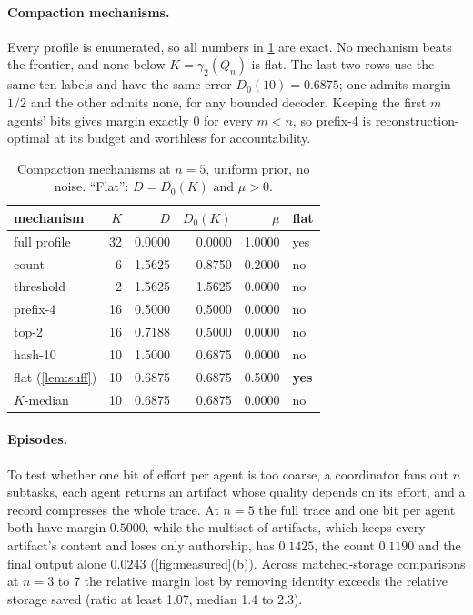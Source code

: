 \documentclass[sigconf,anonymous,acmthm=false]{acmart}
\theoremstyle{acmplain}
\theoremstyle{acmdefinition}
\begin{document}
\paragraph{Compaction mechanisms.} Every profile is enumerated, so all numbers in
\cref{tab:mech} are exact. No mechanism beats the frontier, and none below
$K=\gamma_2(Q_n)$ is flat. The last two rows use the same ten labels and have the same
error $D_0(10)=0.6875$; one admits margin $1/2$ and the other admits none, for any bounded
decoder. Keeping the first $m$ agents' bits gives margin exactly 0 for every $m<n$, so
prefix-4 is reconstruction-optimal at its budget and worthless for accountability.

\begin{table}[t]
\caption{Compaction mechanisms at $n=5$, uniform prior, no noise. ``Flat'': $D=D_0(K)$
and $\mu>0$.}
\label{tab:mech}
\footnotesize
\begin{tabular}{@{}lrrrrl@{}}
\toprule
mechanism & $K$ & $D$ & $D_0(K)$ & $\mu$ & flat\\
\midrule
full profile & 32 & 0.0000 & 0.0000 & 1.0000 & yes\\
count & 6 & 1.5625 & 0.8750 & 0.2000 & no\\
threshold & 2 & 1.5625 & 1.5625 & 0.0000 & no\\
prefix-4 & 16 & 0.5000 & 0.5000 & 0.0000 & no\\
top-2 & 16 & 0.7188 & 0.5000 & 0.0000 & no\\
hash-10 & 10 & 1.5000 & 0.6875 & 0.0000 & no\\
\midrule
flat (\cref{lem:suff}) & 10 & 0.6875 & 0.6875 & 0.5000 & \textbf{yes}\\
$K$-median & 10 & 0.6875 & 0.6875 & 0.0000 & no\\
\bottomrule
\end{tabular}
\end{table}

\paragraph{Episodes.} To test whether one bit of effort per agent is too coarse, a
coordinator fans out $n$ subtasks, each agent returns an artifact whose quality depends on
its effort, and a record compresses the whole trace. At $n=5$ the full trace and one bit
per agent both have margin $0.5000$, while the multiset of artifacts, which keeps every
artifact's content and loses only authorship, has $0.1425$, the count $0.1190$ and the
final output alone $0.0243$ (\cref{fig:measured}(b)). Across matched-storage comparisons
at $n=3$ to 7 the relative margin lost by removing identity exceeds the relative storage
saved (ratio at least 1.07, median 1.4 to 2.3).
\end{document}
